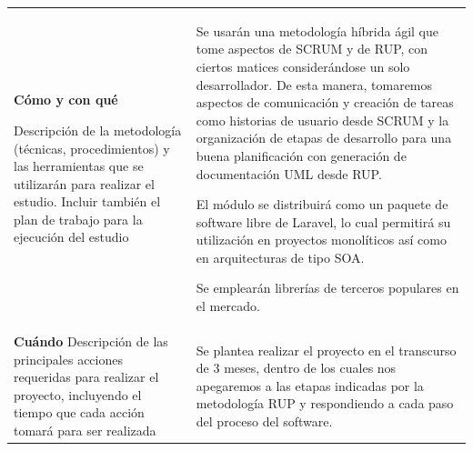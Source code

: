 \begin{longtable}[c]{p{}p{}}
    \textbf{Cómo y con qué}

    {\tiny Descripción de la metodología (técnicas, procedimientos) y las herramientas que se utilizarán para realizar el estudio. Incluir también el plan de trabajo para la ejecución del estudio} &

    Se usarán una metodología híbrida ágil que tome aspectos de SCRUM y de RUP, con ciertos matices considerándose un solo desarrollador. De esta manera, tomaremos aspectos de comunicación y creación de tareas como historias de usuario desde SCRUM y la organización de etapas de desarrollo para una buena planificación con generación de documentación UML desde RUP.
    
    El módulo se distribuirá como un paquete de software libre de Laravel, lo cual permitirá su utilización en proyectos monolíticos así como en arquitecturas de tipo SOA.
    
    Se emplearán librerías de terceros populares en el mercado.\\

    \textbf{Cuándo}
    {\tiny Descripción de las principales acciones requeridas para realizar el proyecto, incluyendo el tiempo que cada acción tomará para ser realizada} &

    Se plantea realizar el proyecto en el transcurso de 3 meses, dentro de los cuales nos apegaremos a las etapas indicadas por la metodología RUP y respondiendo a cada paso del proceso del software. \\
    \bottomrule
\end{longtable}